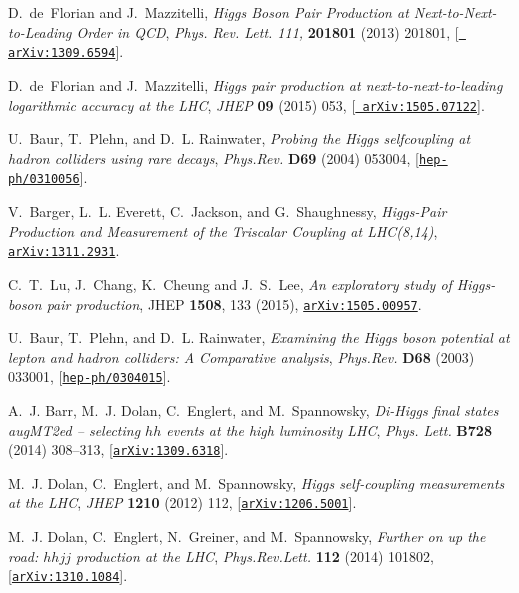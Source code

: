 \documentclass[a4paper,11pt]{article}
\begin{document}
\begin{thebibliography}{100}
D.~de~Florian and J.~Mazzitelli, {\it {Higgs Boson Pair Production at
  Next-to-Next-to-Leading Order in QCD}},  {\em Phys. Rev. Lett. 111,} {\bf
  201801} (2013) 201801, [\href{http://arxiv.org/abs/1309.6594}{{\tt
  arXiv:1309.6594}}].

D.~de~Florian and J.~Mazzitelli, {\it {Higgs pair production at
  next-to-next-to-leading logarithmic accuracy at the LHC}},  {\em JHEP} {\bf
  09} (2015) 053, [\href{http://arxiv.org/abs/1505.07122}{{\tt
  arXiv:1505.07122}}].

U.~Baur, T.~Plehn, and D.~L. Rainwater, {\it {Probing the Higgs selfcoupling at
  hadron colliders using rare decays}},  {\em Phys.Rev.} {\bf D69} (2004)
  053004, [\href{http://arxiv.org/abs/hep-ph/0310056}{{\tt hep-ph/0310056}}].

V.~Barger, L.~L. Everett, C.~Jackson, and G.~Shaughnessy, {\it {Higgs-Pair
  Production and Measurement of the Triscalar Coupling at LHC(8,14)}},
  \href{http://arxiv.org/abs/1311.2931}{{\tt arXiv:1311.2931}}.

  C.~T.~Lu, J.~Chang, K.~Cheung and J.~S.~Lee,
  {\it An exploratory study of Higgs-boson pair production},
  JHEP {\bf 1508}, 133 (2015),
  \href{http://arxiv.org/abs/1505.00957}{{\tt arXiv:1505.00957}}.
   
U.~Baur, T.~Plehn, and D.~L. Rainwater, {\it {Examining the Higgs boson
  potential at lepton and hadron colliders: A Comparative analysis}},  {\em
  Phys.Rev.} {\bf D68} (2003) 033001,
  [\href{http://arxiv.org/abs/hep-ph/0304015}{{\tt hep-ph/0304015}}].

A.~J. Barr, M.~J. Dolan, C.~Englert, and M.~Spannowsky, {\it {Di-Higgs final
  states augMT2ed -- selecting $hh$ events at the high luminosity LHC}},  {\em
  Phys. Lett.} {\bf B728} (2014) 308--313,
  [\href{http://arxiv.org/abs/1309.6318}{{\tt arXiv:1309.6318}}].

M.~J. Dolan, C.~Englert, and M.~Spannowsky, {\it {Higgs self-coupling
  measurements at the LHC}},  {\em JHEP} {\bf 1210} (2012) 112,
  [\href{http://arxiv.org/abs/1206.5001}{{\tt arXiv:1206.5001}}].

M.~J. Dolan, C.~Englert, N.~Greiner, and M.~Spannowsky, {\it {Further on up the
  road: $hhjj$ production at the LHC}},  {\em Phys.Rev.Lett.} {\bf 112} (2014)
  101802, [\href{http://arxiv.org/abs/1310.1084}{{\tt arXiv:1310.1084}}].


\end{thebibliography}
\end{document}
